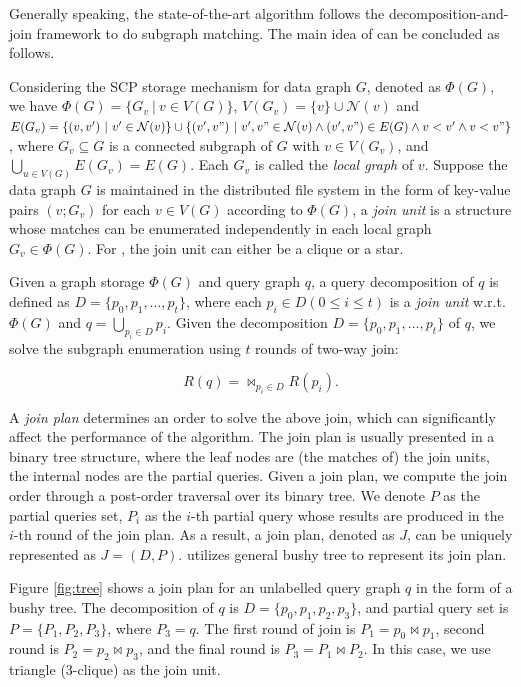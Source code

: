  Generally speaking, the state-of-the-art algorithm \cliquejoin follows the decomposition-and-join framework to do subgraph matching. The main idea of \cliquejoin can be concluded as follows. 

 Considering the SCP storage mechanism for data graph $G$, denoted as $\Phi(G)$, we have $\Phi(G)=\{G_v\ |\ v\in V(G)\}$, $V(G_v)=\{v\} \cup \mathcal{N}(v)$ and $E(G_v)=\{(v,v')\ |\ v'\in \mathcal{N}(v)\}\cup\{(v',v")\ |\ v',v"\in \mathcal{N}(v)\wedge(v',v")\in E(G)\wedge v<v'\wedge v<v"\}$, where $G_v\subseteq G$ is a connected subgraph of $G$ with $v\in V(G_v)$, and $\bigcup_{u\in V(G)}E(G_v)=E(G)$. Each $G_v$ is called the \textit{local graph} of $v$. Suppose the data graph $G$ is maintained in the distributed file system in the form of key-value pairs $(v;G_v)$ for each $v\in V(G)$ according to $\Phi(G)$, a \textit{join unit} is a structure whose matches can be enumerated independently in each local graph $G_v\in \Phi(G)$. For \cliquejoin, the join unit can either be a clique or a star. 

 Given a graph storage $\Phi(G)$ and query graph $q$, a query decomposition of $q$ is defined as $D=\{p_0,p_1,\dots,p_t\}$, where each $p_i\in D(0\leq i\leq t)$ is a \textit{join unit} w.r.t. $\Phi(G)$ and $q = \bigcup_{p_i\in D}p_i$. Given the decomposition $D=\{p_0,p_1,\dots,p_t\}$ of $q$, we solve the subgraph enumeration using $t$ rounds of two-way join:

\begin{equation} \label{eq:1}
R(q) = \bowtie_{p_i\in D}R(p_i).
\end{equation}

 A \textit{join plan} determines an order to solve the above join, which can significantly affect the performance of the algorithm. The join plan is usually presented in a binary tree structure, where the leaf nodes are (the matches of) the join units, the internal nodes are the partial queries. Given a join plan, we compute the join order through a post-order traversal over its binary tree. We denote $P$ as the partial queries set, $P_i$ as the $i$-th partial query whose results are produced in the $i$-th round of the join plan. As a result, a join plan, denoted as $J$, can be uniquely represented as $J = (D, P)$. \cliquejoin utilizes general bushy tree \cite{tree} to represent its join plan. \\

\begin{example}
Figure \ref{fig:tree} shows a join plan for an unlabelled query graph $q$ in the form of a bushy tree. The decomposition of $q$ is $D=\{p_0, p_1, p_2, p_3\}$, and partial query set is $P=\{P_1, P_2, P_3\}$, where $P_3=q$. The first round of join is $P_1 = p_0 \Join p_1$, second round is $P_2=p_2 \Join p_3$, and the final round is $P_3 = P_1 \Join P_2$. In this case, we use triangle ($3$-clique) as the join unit.
\end{example}

